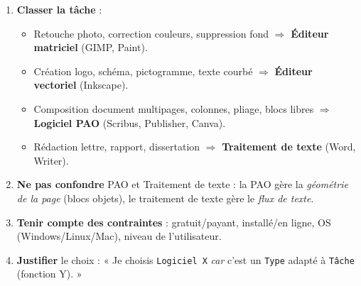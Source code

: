 \documentclass[11pt]{article}
\begin{document}
\begin{methode}
\begin{enumerate}
\item \textbf{Classer la tâche} :
\begin{itemize}
\item Retouche photo, correction couleurs, suppression fond $\Rightarrow$ \textbf{Éditeur matriciel} (GIMP, Paint).
\item Création logo, schéma, pictogramme, texte courbé $\Rightarrow$ \textbf{Éditeur vectoriel} (Inkscape).
\item Composition document multipages, colonnes, pliage, blocs libres $\Rightarrow$ \textbf{Logiciel PAO} (Scribus, Publisher, Canva).
\item Rédaction lettre, rapport, dissertation $\Rightarrow$ \textbf{Traitement de texte} (Word, Writer).
\end{itemize}
\item \textbf{Ne pas confondre} PAO et Traitement de texte : la PAO gère la \emph{géométrie de la page} (blocs objets), le traitement de texte gère le \emph{flux de texte}.
\item \textbf{Tenir compte des contraintes} : gratuit/payant, installé/en ligne, OS (Windows/Linux/Mac), niveau de l'utilisateur.
\item \textbf{Justifier} le choix : « Je choisis \texttt{Logiciel X} \emph{car} c'est un \texttt{Type} adapté à \texttt{Tâche} (fonction Y). »
\end{enumerate}
\end{methode}
\end{document}
